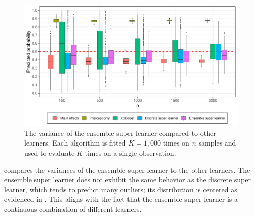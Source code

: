 \documentclass[./main.tex]{subfiles}
\begin{document}
\begin{figure}[H]
    \centering
    \includegraphics[width=\textwidth]{figures/learner_vars_w_esl_1000.pdf}
    \caption{The variance of the ensemble super learner compared to other learners. Each algorithm is fitted $ K = 1,000 $ times on $n$ samples and used to evaluate $ K $ times on a single observation.}
    \label{fig:learner_vars_w_esl_1000}
\end{figure}
 compares the variances of the ensemble super learner to the other learners. The ensemble super learner does not exhibit the same behavior as the discrete super learner, which tends to predict many outliers; its distribution is centered as evidenced in . This aligns with the fact that the ensemble super learner is a continuous combination of different learners. 
\end{document}
